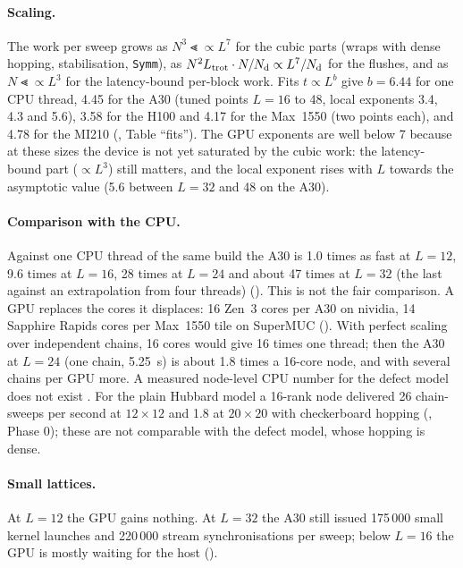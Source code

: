 \paragraph{Scaling.} The work per sweep grows as $N^3\Lt\propto L^7$ for the cubic parts (wraps with dense hopping, stabilisation, \texttt{Symm}), as $N^2L_{\rm trot}\cdot N/N_{\rm d}\propto L^7/N_{\rm d}$ for the flushes, and as $N\Lt\propto L^3$ for the latency-bound per-block work. Fits $t\propto L^b$ give $b=6.44$ for one CPU thread, 4.45 for the A30 (tuned points $L=16$ to 48, local exponents 3.4, 4.3 and 5.6), 3.58 for the H100 and 4.17 for the Max~1550 (two points each), and 4.78 for the MI210 (, Table ``fits''). %
The GPU exponents are well below 7 because at these sizes the device is not yet saturated by the cubic work: the latency-bound part ($\propto L^3$) still matters, and the local exponent rises with $L$ towards the asymptotic value (5.6 between $L=32$ and 48 on the A30).

\paragraph{Comparison with the CPU.} Against one CPU thread of the same build the A30 is 1.0 times as fast at $L=12$, 9.6 times at $L=16$, 28 times at $L=24$ and about 47 times at $L=32$ (the last against an extrapolation from four threads) (). %
This is not the fair comparison. A GPU replaces the cores it displaces: 16 Zen~3 cores per A30 on nividia, 14 Sapphire Rapids cores per Max~1550 tile on SuperMUC (). With perfect scaling over independent chains, 16 cores would give 16 times one thread; then the A30 at $L=24$ (one chain, 5.25~s) is about 1.8 times a 16-core node, and with several chains per GPU more. A measured node-level CPU number for the defect model does not exist . For the plain Hubbard model a 16-rank node delivered 26 chain-sweeps per second at $12\times12$ and 1.8 at $20\times20$ with checkerboard hopping (, Phase 0); %
these are not comparable with the defect model, whose hopping is dense.

\paragraph{Small lattices.} At $L=12$ the GPU gains nothing. At $L=32$ the A30 still issued 175\,000 small kernel launches and 220\,000 stream synchronisations per sweep; below $L=16$ the GPU is mostly waiting for the host (). %

